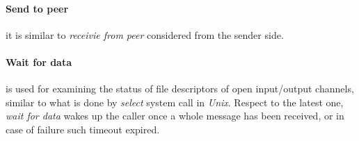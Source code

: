 \paragraph{Send to peer}
it is similar to \textit{receivie from peer} considered from the sender side.

\paragraph{Wait for data} is used for examining the status of file descriptors of open input/output channels,
similar to what is done by \textit{select} system call in \textit{Unix}. Respect to the latest one,
\textit{wait for data} wakes up the caller once a whole message has been received, or in case of failure such
timeout expired.

